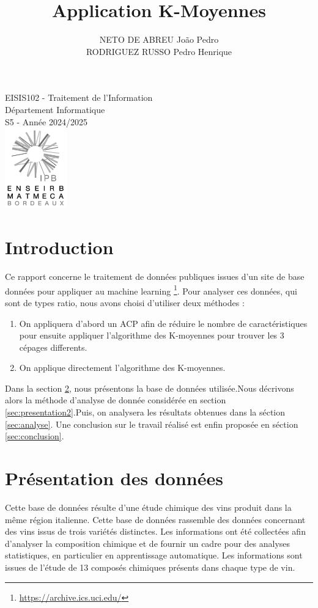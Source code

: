 \documentclass[a4paper,12pt]{article}
\title{Application K-Moyennes}
\author{NETO DE ABREU Jo\~ao Pedro \\ RODRIGUEZ RUSSO Pedro Henrique}
\date{}
\begin{document}
\maketitle

\begin{center}
  \large
  EISIS102 - Traitement de l'Information \\
  Département Informatique\\
  S5 - Année 2024/2025\\
  \vfill
  \includegraphics[width=0.2\textwidth]{enseirb-matmeca.png}
\end{center}

\newpage

\tableofcontents

\newpage

\section{Introduction}
Ce rapport concerne le traitement de données publiques issues d'un site de base données pour appliquer au machine learning \footnote{\url{https://archive.ics.uci.edu/}}. Pour analyser ces données, qui sont de types ratio, nous avons choisi d'utiliser deux méthodes :\\
\begin{enumerate}
\item On appliquera d'abord un ACP afin de réduire le nombre de caractéristiques pour ensuite appliquer l'algorithme des K-moyennes pour trouver les 3 cépages differents.\\
\item On applique directement l'algorithme des K-moyennes.
\end{enumerate}
\vspace{1cm}
Dans la section \ref{sec:presentation1}, nous présentons la base de données utilisée.Nous décrivons alors la méthode d'analyse de donnée considérée en section \ref{sec:presentation2}.Puis, on analysera les résultats obtenues dans la séction \ref{sec:analyse}. Une conclusion sur le travail réalisé est enfin proposée en séction \ref{sec:conclusion}.

\section{Présentation des données}
\label{sec:presentation1}
Cette base de données résulte d'une étude chimique des vins produit dans la même région italienne. Cette base de données rassemble des données concernant des vins issus de trois variétés distinctes. Les informations ont été collectées afin d'analyser la composition chimique et de fournir un cadre pour des analyses statistiques, en particulier en apprentissage automatique. Les informations sont issues de l'étude de 13 composés chimiques présents dans chaque type de vin.
\end{document}
